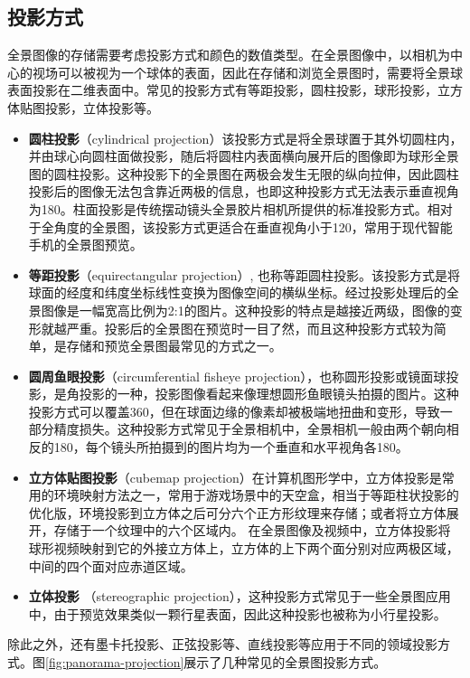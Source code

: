 \subsection{投影方式}
全景图像的存储需要考虑投影方式和颜色的数值类型。在全景图像中，以相机为中心的视场可以被视为一个球体的表面，因此在存储和浏览全景图时，需要将全景球表面投影在二维表面中。常见的投影方式有等距投影，圆柱投影，球形投影，立方体贴图投影，立体投影等。
\begin{itemize}
\item \textbf{圆柱投影}（cylindrical projection）该投影方式是将全景球置于其外切圆柱内，并由球心向圆柱面做投影，随后将圆柱内表面横向展开后的图像即为球形全景图的圆柱投影。这种投影下的全景图在两极会发生无限的纵向拉伸，因此圆柱投影后的图像无法包含靠近两极的信息，也即这种投影方式无法表示垂直视角为180。柱面投影是传统摆动镜头全景胶片相机所提供的标准投影方式。相对于全角度的全景图，该投影方式更适合在垂直视角小于120，常用于现代智能手机的全景图预览。
\item \textbf{等距投影}（equirectangular projection）, 也称等距圆柱投影。该投影方式是将球面的经度和纬度坐标线性变换为图像空间的横纵坐标。经过投影处理后的全景图像是一幅宽高比例为2:1的图片。这种投影的特点是越接近两级，图像的变形就越严重。投影后的全景图在预览时一目了然，而且这种投影方式较为简单，是存储和预览全景图最常见的方式之一。
\item \textbf{圆周鱼眼投影}（circumferential fisheye projection），也称圆形投影或镜面球投影，是角投影的一种，投影图像看起来像理想圆形鱼眼镜头拍摄的图片。这种投影方式可以覆盖360，但在球面边缘的像素却被极端地扭曲和变形，导致一部分精度损失。这种投影方式常见于全景相机中，全景相机一般由两个朝向相反的180，每个镜头所拍摄到的图片均为一个垂直和水平视角各180。
\item \textbf{立方体贴图投影}（cubemap projection）在计算机图形学中，立方体投影是常用的环境映射方法之一，常用于游戏场景中的天空盒，相当于等距柱状投影的优化版，环境投影到立方体之后可分六个正方形纹理来存储；或者将立方体展开，存储于一个纹理中的六个区域内。 
在全景图像及视频中，立方体投影将球形视频映射到它的外接立方体上，立方体的上下两个面分别对应两极区域，中间的四个面对应赤道区域。
\item \textbf{立体投影} （stereographic projection），这种投影方式常见于一些全景图应用中，由于预览效果类似一颗行星表面，因此这种投影也被称为小行星投影。
\end{itemize}

除此之外，还有墨卡托投影、正弦投影等、直线投影等应用于不同的领域投影方式。图\ref{fig:panorama-projection}展示了几种常见的全景图投影方式。


